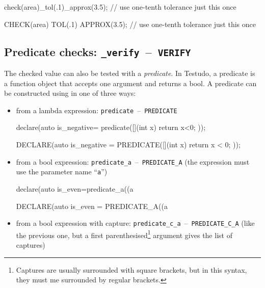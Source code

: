 \documentclass[twoside, a4paper, article]{memoir}
\newcommand*\testudocolor{\color{red!80!blue}}
\newcommand*\testudo[1]{\texttt{\testudocolor{}#1}}
\newcommand*\testudopair[2]{\testudo{#1}~--~\testudo{#2}}
\newcommand\subsectiontestudopair[3]{%
  \subsection[#1]{#1: \testudopair{#2}{#3}}}
\begin{document}
\begin{cpplisting}
check(area)_tol(.1)_approx(3.5); // use one-tenth tolerance just this once
\end{cpplisting}

\begin{cpplisting}
CHECK(area) TOL(.1) APPROX(3.5); // use one-tenth tolerance just this once
\end{cpplisting}


\subsectiontestudopair{Predicate checks}{\_verify}{VERIFY}
\label{sec:predicate-checks}

The checked value can also be tested with a \emph{predicate}.  In Testudo, a
predicate is a function object that accepts one argument and returns a
bool.  A predicate can be constructed using in one of three ways:
\begin{itemize}
\item from a lambda expression: \testudopair{predicate}{PREDICATE}
\begin{cpplisting}
declare(auto is_negative=
        predicate([](int x) { return x<0; }));
\end{cpplisting}

\begin{cpplisting}
DECLARE(auto is_negative =
        PREDICATE([](int x) { return x < 0; }));
\end{cpplisting}

\item from a bool expression:
  \testudopair{predicate\_a}{PREDICATE\_A} (the expression must use the
  parameter name ``\texttt{a}'')
\begin{cpplisting}
declare(auto is_even=predicate_a((a%
\end{cpplisting}

\begin{cpplisting}
DECLARE(auto is_even = PREDICATE_A((a %
\end{cpplisting}

\item from a bool expression with capture:
  \testudopair{predicate\_c\_a}{PREDICATE\_C\_A} (like the previous one, but a
  first parenthesised\footnote{Captures are usually surrounded with square
    brackets, but in this syntax, they must me surrounded by regular brackets.}
  argument gives the list of captures)

\end{itemize}
\end{document}
